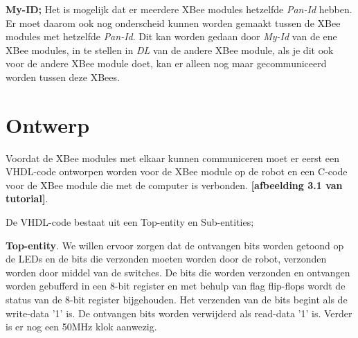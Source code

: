 \documentclass{report}
\begin{document}
\textbf{My-ID;}
\newline
Het is mogelijk dat er meerdere XBee modules hetzelfde\textit{ Pan-Id} hebben. Er moet daarom ook nog onderscheid kunnen worden gemaakt tussen de XBee modules met hetzelfde \textit{Pan-Id}. Dit kan worden gedaan door \textit{My-Id} van de ene XBee modules, in te stellen in \textit{DL} van de andere XBee module, als je dit ook voor de andere XBee module doet, kan er alleen nog maar gecommuniceerd worden tussen deze XBees.


\section{Ontwerp}
Voordat de XBee modules met elkaar kunnen communiceren moet er eerst een VHDL-code ontworpen worden voor de XBee module op de robot en een C-code voor de XBee module die met de computer is verbonden.
\textbf{[afbeelding 3.1 van tutorial]}.
\newline

De VHDL-code bestaat uit een Top-entity en Sub-entities;
\newline

\textbf{Top-entity}.
\newline
We willen ervoor zorgen dat de ontvangen bits worden getoond op de LEDs en de bits die verzonden moeten worden door de robot, verzonden worden door middel van de switches. De bits die worden verzonden en ontvangen worden gebufferd in een 8-bit register en met behulp van flag flip-flops wordt de status van de 8-bit register bijgehouden. Het verzenden van de bits begint als de write-data '1' is. De ontvangen bits worden verwijderd als read-data '1' is. Verder is er nog een 50MHz klok aanwezig.
\newline
\end{document}
